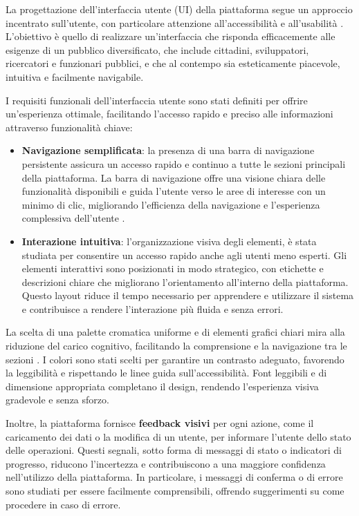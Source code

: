 La progettazione dell'interfaccia utente (UI) della piattaforma segue un approccio incentrato sull'utente, con particolare attenzione all'accessibilità e all'usabilità \cite{w3c2018}. L'obiettivo è quello di realizzare un'interfaccia che risponda efficacemente alle esigenze di un pubblico diversificato, che include cittadini, sviluppatori, ricercatori e funzionari pubblici, e che al contempo sia esteticamente piacevole, intuitiva e facilmente navigabile. 

I requisiti funzionali dell'interfaccia utente sono stati definiti per offrire un'esperienza ottimale, facilitando l'accesso rapido e preciso alle informazioni attraverso funzionalità chiave:
\begin{itemize}
    \item \textbf{Navigazione semplificata}: la presenza di una barra di navigazione persistente assicura un accesso rapido e continuo a tutte le sezioni principali della piattaforma. La barra di navigazione offre una visione chiara delle funzionalità disponibili e guida l’utente verso le aree di interesse con un minimo di clic, migliorando l'efficienza della navigazione e l’esperienza complessiva dell’utente \cite{cooper2014}. 
    \item \textbf{Interazione intuitiva}: l’organizzazione visiva degli elementi, è stata studiata per consentire un accesso rapido anche agli utenti meno esperti. Gli elementi interattivi sono posizionati in modo strategico, con etichette e descrizioni chiare che migliorano l'orientamento all'interno della piattaforma. Questo layout riduce il tempo necessario per apprendere e utilizzare il sistema e contribuisce a rendere l’interazione più fluida e senza errori.
\end{itemize}

La scelta di una palette cromatica uniforme e di elementi grafici chiari mira alla riduzione del carico cognitivo, facilitando la comprensione e la navigazione tra le sezioni \cite{nielsen1994}. I colori sono stati scelti per garantire un contrasto adeguato, favorendo la leggibilità e rispettando le linee guida sull’accessibilità. Font leggibili e di dimensione appropriata completano il design, rendendo l’esperienza visiva gradevole e senza sforzo. 

Inoltre, la piattaforma fornisce \textbf{feedback visivi} per ogni azione, come il caricamento dei dati o la modifica di un utente, per informare l'utente dello stato delle operazioni. Questi segnali, sotto forma di messaggi di stato o indicatori di progresso, riducono l'incertezza e contribuiscono a una maggiore confidenza nell'utilizzo della piattaforma. In particolare, i messaggi di conferma o di errore sono studiati per essere facilmente comprensibili, offrendo suggerimenti su come procedere in caso di errore.

